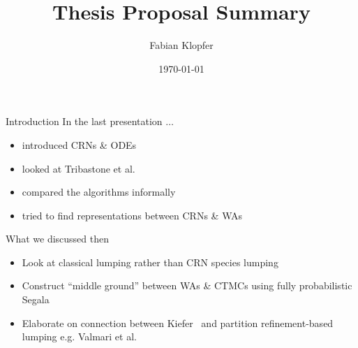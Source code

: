 \documentclass[rgb, pdf]{beamer}
\title{Thesis Proposal Summary}
\author{Fabian Klopfer}
\date{\today}
\institute{Modelling of Complex Self-Organizing Systems Group}
\begin{document}
    \begin{frame}
        \titlepage
    \end{frame}

    \begin{frame}{Introduction}
        In the last presentation $\dots$ \\ \vspace{0.5cm}
        \begin{itemize}
            \item introduced CRNs \& ODEs \\ \vspace{0.7cm}
            \item looked at Tribastone et al.~\autocite{Cardelli2017MaximalAO} \\ \vspace{0.7cm}
            \item compared the algorithms informally \\ \vspace{0.7cm}
            \item tried to find representations between CRNs \& WAs \\ \vspace{0.7cm}
        \end{itemize}
    \end{frame}
    
    \begin{frame}{What we discussed then}
        \begin{itemize}
            \item Look at classical lumping rather than CRN species lumping \\  \vspace{0.7cm}
            \item Construct ``middle ground'' between WAs \& CTMCs using fully probabilistic Segala \\ \vspace{0.7cm}
            \item Elaborate on connection between Kiefer~\autocite{Kiefer2013OnTC} and partition refinement-based lumping e.g. Valmari et al.~\autocite{valmari} \\ \vspace{0.7cm}
        \end{itemize}
    \end{frame}
   
\end{document}
